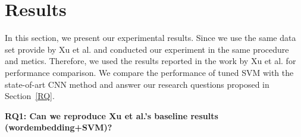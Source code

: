 

\section{Results}
In this section, we present our experimental results. Since we use the same data set provide by Xu
et al.\cite{xu2016predicting} and conducted our experiment in the same procedure and metics. 
Therefore, we used the results reported in the work by Xu et al.\cite{xu2016predicting} for performance
comparison. We compare the performance of tuned SVM with the state-of-art CNN method and answer
our research questions proposed in Section~\ref{RQ}.


\textbf{RQ1: Can we reproduce Xu et al.'s baseline results (wordembedding+SVM)?}

